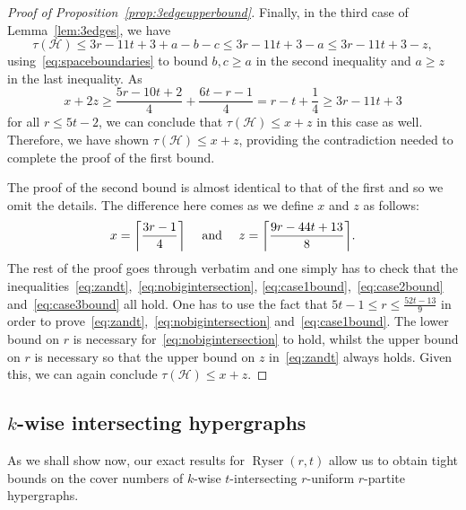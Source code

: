 \documentclass[a4paper,twoside,11pt]{article}
\DeclarePairedDelimiter{\ceil}{\lceil}{\rceil}
\numberwithin{thm}{section}
\theoremstyle{definition}
\theoremstyle{remark}
\theoremstyle{definition}
\def\cH{{\mathcal H}}
\newcommand{\m}[1]{\mathcal{#1}}
\DeclareMathOperator{\Ryser}{Ryser}
\begin{document}
\begin{proof}[Proof of Proposition~\ref{prop:3edgeupperbound}]
Finally, in the third case of Lemma~\ref{lem:3edges}, we have
\[ \tau(\cH)\leq 3r-11t+3+a-b-c\leq 3r-11t+3-a \leq 3r-11t+3-z, \]
 using~\eqref{eq:spaceboundaries} to bound $b, c \ge a$ in the second inequality and $a \ge z$ in the last inequality. As 
\begin{equation} \label{eq:case3bound}
    x+2z\geq \frac{5r-10t+2}{4}+\frac{6t-r-1}{4} = r - t + \frac14 \geq 3r-11t+3 
\end{equation}
for all $r\leq 5t-2$, we can conclude that $\tau(\cH)\leq x+z$ in this case as well. Therefore, we have shown $\tau(\cH)\leq x+z$, providing the contradiction needed to complete the proof of the first bound. 

\medskip

The proof of the second bound is almost identical to that of the first and so we omit the details. The difference here comes as we define $x$ and $z$ as follows:
\[x =\ceil*{\frac{3r-1}{4}} \quad \mbox{ and } \quad z = \ceil*{\frac{9r-44t+13}{8}}.\]
The rest of the proof goes through verbatim and one simply has to check that the inequalities~\eqref{eq:zandt},~\eqref{eq:nobigintersection}, \eqref{eq:case1bound},~\eqref{eq:case2bound} and~\eqref{eq:case3bound} all hold.  One has to use the fact that $5t-1 \leq r \leq \frac{52t-13}{9}$ in order to prove~\eqref{eq:zandt},~\eqref{eq:nobigintersection} and~\eqref{eq:case1bound}. The lower bound on $r$ is necessary for~\eqref{eq:nobigintersection} to hold, whilst the upper bound on $r$ is necessary so that the upper bound on $z$ in~\eqref{eq:zandt} always holds. Given this, we can again conclude $\tau(\m H) \le x + z$.
\end{proof}


\subsection{$k$-wise intersecting hypergraphs} \label{sec:kwise}

As we shall show now, our exact results for $\Ryser(r,t)$ allow us to obtain tight bounds on the cover numbers of $k$-wise $t$-intersecting $r$-uniform $r$-partite hypergraphs.
\end{document}
